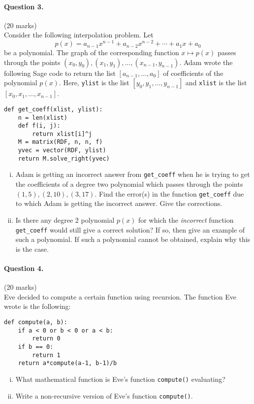 \documentclass[12pt]{article}
\begin{document}
\paragraph{Question 3.}\hfill (20 marks)\\
Consider the following interpolation problem. Let 
$$p(x) = a_{n-1} x^{n-1} +  a_{n-2} x^{n-2}
+ \cdots + a_1 x + a_0$$ be a polynomial. The graph of the corresponding
function $x\mapsto p(x)$ passes through the
points $(x_0, y_0), (x_1, y_1), \dots, (x_{n-1}, y_{n-1})$.
\noindent Adam wrote the following Sage code to return the list $[a_{n-1},\dots,a_0]$
of coefficients of the polynomial $p(x)$.
Here, \verb|ylist| is the list $[y_0, y_1, \dots, y_{n-1}]$ and
\verb|xlist| is the list $[x_0, x_1, \dots, x_{n-1}]$.
\begin{verbatim}
def get_coeff(xlist, ylist):
    n = len(xlist)
    def f(i, j):
        return xlist[i]^j
    M = matrix(RDF, n, n, f)
    yvec = vector(RDF, ylist)
    return M.solve_right(yvec)
\end{verbatim}
\begin{enumerate}[(i)]
    \item Adam is getting an incorrect answer   from \verb|get_coeff| when he
    is trying to get the coefficients of a degree two polynomial which
    passes through the points $(1, 5), (2, 10), (3, 17)$. Find the error(s) in
    the function \verb|get_coeff| due to which Adam is getting the
    incorrect answer. Give the corrections.
    \item Is there any degree 2 polynomial $p(x)$ for which the
    \emph{incorrect} function \verb|get_coeff| would still give a correct
    solution? If so, then give an example of such a polynomial. If such
    a polynomial cannot be obtained, explain why this is the case.
\end{enumerate}

\bigskip
\bigskip
\newpage 

\paragraph{Question 4.}\hfill (20 marks)\\
Eve decided to compute a certain function using recursion. The function Eve
wrote is the following: 
\begin{verbatim}
def compute(a, b):
    if a < 0 or b < 0 or a < b:
        return 0
    if b == 0:
        return 1
    return a*compute(a-1, b-1)/b
\end{verbatim}
\begin{enumerate}[(i)]
    \item What mathematical function is Eve's function \verb|compute()|
    evaluating?
    \item Write a non-recursive version of Eve's function \verb|compute()|.
\end{enumerate}
\bigskip
\bigskip
\bigskip
\bigskip
\end{document}
